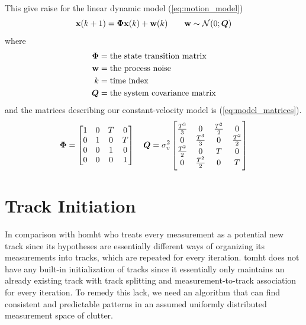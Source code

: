 This give raise for the linear dynamic model (\ref{eq:motion_model})
\begin{equation}\label{eq:motion_model}
\boldsymbol{\mathbf{x}}(k+1) = \bm{\Phi} \boldsymbol{\mathbf{x}}(k) + \boldsymbol{\mathbf{w}}(k) \qquad \boldsymbol{\mathbf{w}} \sim \mathcal{N}(0;\bm{Q})
\end{equation}
where 
\begin{equation*}
\begin{split}
\bm{\Phi} 	&= \text{the state transition matrix} \\
\boldsymbol{\mathbf{w}}		&= \text{the process noise} \\
k 			&= \text{time index} \\
\bm{Q}		&= \text{the system covariance matrix}
\end{split}
\end{equation*}
and the matrices describing our constant-velocity model is (\ref{eq:model_matrices}).
\begin{equation}\label{eq:model_matrices}
\bm{\Phi} =	\begin{bmatrix}
1 & 0 & T & 0 \\
0 & 1 & 0 & T \\
0 & 0 & 1 & 0 \\
0 & 0 & 0 & 1 \\
\end{bmatrix}
\quad
\bm{Q}	= \sigma_v^2 \begin{bmatrix}
\frac{T^3}{3} 	& 0 				& \frac{T^2}{2}	& 0 			\\
0 				& \frac{T^3}{3}  	& 0 			& \frac{T^2}{2}	\\
\frac{T^2}{2}	& 0					& T				& 0				\\
0				& \frac{T^2}{2}		& 0				& T				\\
\end{bmatrix}
\end{equation}

\section{Track Initiation}
In comparison with \gls{homht} who treats every measurement as a potential new track since its hypotheses are essentially different ways of organizing its measurements into tracks, which are repeated for every iteration. \Gls{tomht} does not have any built-in initialization of tracks since it essentially only maintains an already existing track with track splitting and measurement-to-track association for every iteration. To remedy this lack, we need an algorithm that can find consistent and predictable patterns in an assumed uniformly distributed measurement space of clutter. 

